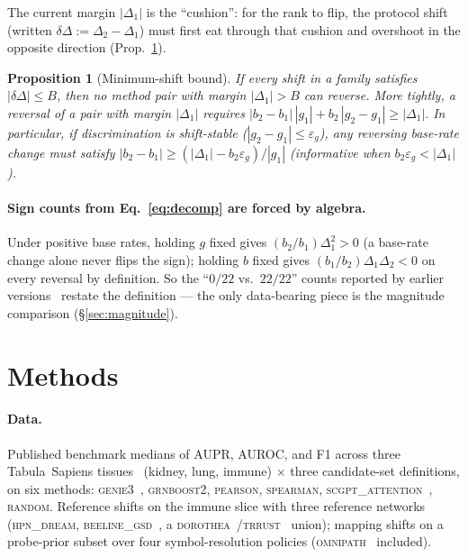 \documentclass[sigconf,anonymous]{acmart}
\newtheorem{proposition}{Proposition}
\begin{document}
The current margin $|\Delta_1|$ is the ``cushion'': for the rank to flip,
the protocol shift (written $\delta\Delta := \Delta_2 - \Delta_1$) must
first eat through that cushion and overshoot in the opposite direction
(Prop.~\ref{prop:minshift}).

\begin{proposition}[Minimum-shift bound]
\label{prop:minshift}
If every shift in a family satisfies $|\delta\Delta| \le B$, then no method
pair with margin $|\Delta_1| > B$ can reverse. More tightly, a reversal of
a pair with margin $|\Delta_1|$ requires
\(
|b_2-b_1|\,|g_1| + b_2\,|g_2-g_1| \ge |\Delta_1|.
\)
In particular, if discrimination is shift-stable ($|g_2-g_1| \le
\varepsilon_g$), any reversing base-rate change must satisfy
$|b_2-b_1| \ge (|\Delta_1| - b_2\varepsilon_g)/|g_1|$ (informative when
$b_2\varepsilon_g < |\Delta_1|$).
\end{proposition}

\paragraph{Sign counts from Eq.~\ref{eq:decomp} are forced by algebra.}
Under positive base rates, holding $g$ fixed gives $(b_2/b_1)\Delta_1^2>0$
(a base-rate change alone never flips the sign); holding $b$ fixed gives
$(b_1/b_2)\Delta_1\Delta_2 < 0$ on every reversal by definition. So the
``$0/22$ vs.\ $22/22$'' counts reported by earlier
versions~\cite{anon2025evalbias} restate the definition --- the only
data-bearing piece is the magnitude comparison (\S\ref{sec:magnitude}).

\section{Methods}
\label{sec:methods}

\paragraph{Data.} Published benchmark medians of AUPR, AUROC, and F1
across three Tabula~Sapiens tissues~\cite{tabulasapiens2022} (kidney, lung,
immune) $\times$ three candidate-set definitions, on six methods:
\textsc{genie3}~\cite{huynhthu2010}, \textsc{grnboost2}, \textsc{pearson},
\textsc{spearman}, \textsc{scgpt\_attention}~\cite{cui2024scgpt},
\textsc{random}. Reference shifts on the immune slice with three
reference networks (\textsc{hpn\_dream},
\textsc{beeline\_gsd}~\cite{pratapa2020}, a
\textsc{dorothea}~\cite{holland2020}/\textsc{trrust}~\cite{han2018} union);
mapping shifts on a probe-prior subset over four symbol-resolution policies
(\textsc{omnipath}~\cite{turei2021} included).
\end{document}
